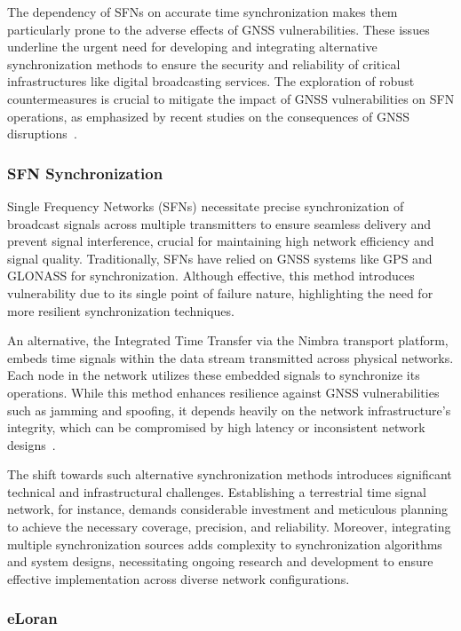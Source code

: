 \documentclass[12pt, a4paper]{extarticle}
\begin{document}
The dependency of SFNs on accurate time synchronization makes them particularly
prone to the adverse effects of GNSS vulnerabilities. These issues underline
the urgent need for developing and integrating alternative synchronization
methods to ensure the security and reliability of critical infrastructures
like digital broadcasting services. The exploration of robust countermeasures
is crucial to mitigate the impact of GNSS vulnerabilities on SFN operations, as
emphasized by recent studies on the consequences of GNSS
disruptions~\cite{machaj2021impact}.

\subsubsection{SFN Synchronization}\label{sfn-sync}

Single Frequency Networks (SFNs) necessitate precise synchronization of
broadcast signals across multiple transmitters to ensure seamless delivery and
prevent signal interference, crucial for maintaining high network efficiency
and signal quality. Traditionally, SFNs have relied on GNSS systems like GPS
and GLONASS for synchronization. Although effective, this method introduces
vulnerability due to its single point of failure nature, highlighting the need for
more resilient synchronization techniques.

An alternative, the Integrated Time Transfer via the Nimbra transport platform,
embeds time signals within the data stream transmitted across physical networks. Each
node in the network utilizes these embedded signals to synchronize its
operations. While this method enhances resilience against GNSS vulnerabilities
such as jamming and spoofing, it depends heavily on the network
infrastructure's integrity, which can be compromised by high latency or
inconsistent network designs~\cite{Hellstrom2007,ptpscale}.

The shift towards such alternative synchronization methods introduces
significant technical and infrastructural challenges. Establishing a
terrestrial time signal network, for instance, demands considerable investment
and meticulous planning to achieve the necessary coverage, precision, and
reliability. Moreover, integrating multiple synchronization sources adds
complexity to synchronization algorithms and system designs, necessitating
ongoing research and development to ensure effective implementation across
diverse network configurations.

\subsubsection{eLoran}\label{eloran-chap}
\end{document}
